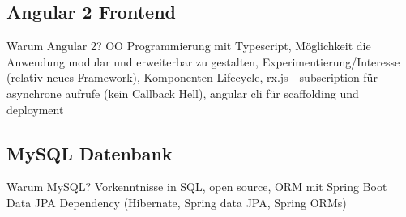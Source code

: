 \subsection{Angular 2 Frontend}
Warum Angular 2? OO Programmierung mit Typescript, Möglichkeit die Anwendung modular und erweiterbar zu gestalten, Experimentierung/Interesse (relativ neues Framework), Komponenten Lifecycle, rx.js - subscription für asynchrone aufrufe (kein Callback Hell), angular cli für scaffolding und deployment

\subsection{MySQL Datenbank}
Warum MySQL? Vorkenntnisse in SQL, open source, ORM mit Spring Boot Data JPA Dependency (Hibernate, Spring data JPA, Spring ORMs)